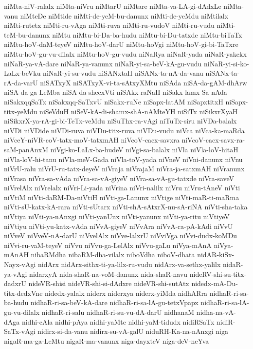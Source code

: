 {niMta-niV-ralalx
niMta-niVru
niMtarU
niMtare
niMta-va-LA-gi-dAdxLe
niMta-vanu
niMteDe
niMtide
niMti-de-yeM-bu-danunx
niMti-de-yeMdu
niMtilalx
niMti-rutetx
niMti-ru-vAga
niMti-ruva
niMti-ru-vudoV
niMti-ru-vudu
niMti-teM-bu-danunx
niMtu
niMtu-bi-Da-ba-hudu
niMtu-bi-Du-tatxde
niMtu-biTaTx
niMtu-hoV-daM-teyeV
niMtu-hoV-darU
niMtu-hoVgi
niMtu-hoV-gi-bi-TaTxre
niMtu-hoV-gu-vu-dilalx
niMtu-hoV-gu-vudu
niNaRya
niNaR-yada
niNaR-yakekx
niNaR-ya-vA-dare
niNaR-ya-vanunx
niNaR-yi-sa-beV-kA-gu-vudu
niNaR-yi-si-ko-LaLx-beVku
niNaR-yi-su-vudu
niSANxtaH
niSANx-ta-nA-da-vanu
niSANx-ta-rA-da-varU
niSATxyX
niSATxyX-vi-ta-sAtxyXMtu
niSAda
niSA-da-gAM-dhArw
niSA-da-ga-LeMba
niSA-da-shecxVti
niSAkx-raNaH
niSakx-lamx-Sa-nAda
niSakxqqSaTx
niSakxqq-SaTxvU
niSakx-ruNe
niSapx-latAM
niSapxtitxH
niSapx-titx-yeMdu
niSeVduH
niSeV-kA-di-shamx-shA-nAMteYH
niSiTx
niSikxrXyaH
niSikxrX-ya-rA-gi-bi-TeTx-veMdu
niSuThx-ra-vAgi
niTuTx-siru
niVDa-balalx
niVDi
niVDide
niVDi-ruva
niVDu-titx-ruva
niVDu-vudu
niVca
niVca-ka-maRda
niVceY-niVR-coV-tatx-moV-tatxmAH
niVcoV-cacx-savxra
niVcoV-cacx-savx-ra-saM-panAnxM
niVgi-ko-LaLx-ba-hudeV
niVgi-sa-balalx
niVla
niVla-loV-hitaH
niVla-loV-hi-tanu
niVla-meV-Gada
niVla-toV-yada
niVneV
niVni-danunx
niVnu
niVrU-ralu
niVrU-ru-tatx-deyeV
niVraja
niVrajaM
niVra-ja-satxmAH
niVranunx
niVrasa
niVra-sa-vAda
niVra-sa-vA-giyeV
niVra-sa-vA-gu-tatxde
niVra-saveV
niVrelAlx
niVrelalx
niVri-Li-yada
niVrina
niVri-nalilx
niVru
niVru-tAneV
niVti
niVtiM
niVti-daRM-Da-niVtiH
niVti-ga-Lanunx
niVtige
niVti-maR-ti-maRma
niVti-sU-katx-kA-rara
niVti-sUtarx
niVti-shA-sAtxrX-nu-sA-riNA
niVti-sha-taka
niVtiya
niVti-ya-nAnxgi
niVti-yanUnx
niVti-yanunx
niVti-ya-ritu
niVtiyeV
niVtiyu
niVti-yu-katx-vAda
niVvA-giyeV
niVvAra
niVvA-ra-pA-kAdi
niVvU
niVveV
niVveV-nA-darU
niVvelAlx
niVve-lalxrU
niVviVga
niVvi-dudx-koMDu
niVvi-ru-vaM-teyeV
niVvu
niVvu-ga-LelAlx
niVvu-gaLu
niVya-mAnA
niVya-mAnAH
nibaRMdha
nibaRM-dha-vilalx
niboVdha
niboV-dhata
nidAR-kiSx-Nayx-vAgi
nidArx
nidArx-sithx-ti-ya-lilx-ru-vudu
nidArx-va-sethx-yalilx
nidaR-ya-vAgi
nidarxyA
nida-shaR-na-voM-danunx
nida-shaR-navu
nideRV-shi-su-titx-dadxrU
nideVR-shisi
nideVR-shi-si-dAdxre
nideVR-shi-sutAtx
nidedx-mA-Du-titx-dedxVne
nidedx-yalalx
niderx
niderxya
niderx-yiMda
nidhARra
nidhaR-ri-sa-ba-hudu
nidhaR-ri-sa-beV-kA-dare
nidhaR-ri-sa-lA-gu-tetxVpapx
nidhaR-ri-sa-lA-gu-vu-dilalx
nidhaR-ri-salu
nidhaR-ri-su-vu-dA-darU
nidhanaM
nidha-na-vA-dAga
nidhi-cAla
nidhi-pAya
nidhi-yaMte
nidhi-yaM-tidudx
nidiRSaTx
nidiR-SaTx-vAgi
nidirx-si-da-vanu
nidirx-su-vA-galU
niduRH-Ka-na-nAnxgi
niga
nigaR-ma-ga-LeMtu
nigaR-ma-vanunx
niga-dayxteV
niga-deV-neYva
}
